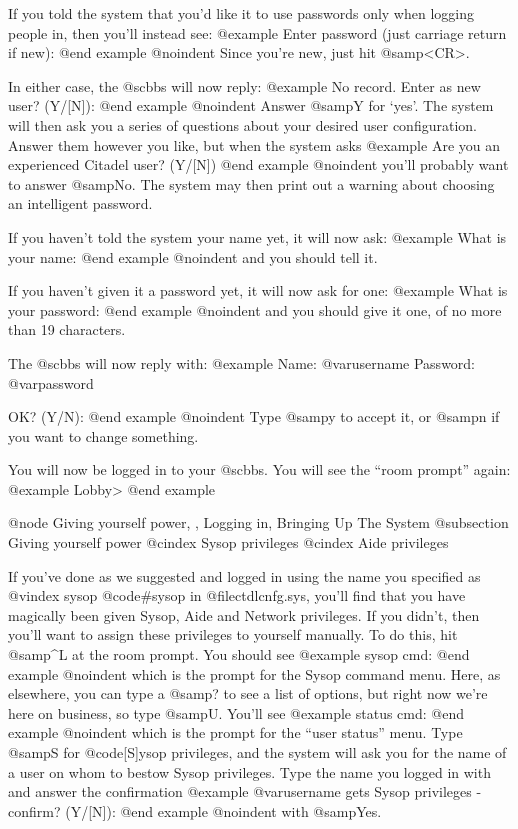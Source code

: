 If you told the system that you'd like it to use passwords only when logging
people in, then you'll instead see:
@example
Enter password (just carriage return if new):
@end example
@noindent
Since you're new, just hit @samp{<CR>}.

In either case, the @sc{bbs} will now reply:
@example
No record. Enter as new user? (Y/[N]):
@end example
@noindent
Answer @samp{Y} for `yes'.  The system will then ask you a series of questions
about your desired user configuration.   Answer them however you like, but
when the system asks
@example
Are you an experienced Citadel user? (Y/[N])
@end example
@noindent
you'll probably want to answer @samp{No}.  The system may then print out a
warning about choosing an intelligent password.

If you haven't told the system your name yet, it will now ask:
@example
What is your name:
@end example
@noindent
and you should tell it.

If you haven't given it a password yet, it will now ask for one:
@example
What is your password:
@end example
@noindent
and you should give it one, of no more than 19 characters.

The @sc{bbs} will now reply with:
@example
Name: @var{username}
Password: @var{password}

OK? (Y/N):
@end example
@noindent
Type @samp{y} to accept it, or @samp{n} if you want to change something.

You will now be logged in to your @sc{bbs}.  You will see the ``room prompt'' again:
@example
Lobby>
@end example

@node Giving yourself power,  , Logging in, Bringing Up The System
@subsection Giving yourself power
@cindex Sysop privileges
@cindex Aide privileges

If you've done as we suggested and logged in using the name you specified as
@vindex sysop
@code{#sysop} in @file{ctdlcnfg.sys}, you'll find that you have magically been
given Sysop, Aide and Network privileges.  If you didn't, then you'll want to
assign these privileges to yourself manually.  To do this, hit @samp{^L} at
the room prompt.  You should see
@example
sysop cmd:
@end example
@noindent
which is the prompt for the Sysop command menu.  Here, as elsewhere, you can
type a @samp{?}
to see a list of options, but right now we're here on business, so type
@samp{U}.  You'll see
@example
status cmd:
@end example
@noindent
which is the prompt for the ``user status'' menu.  Type @samp{S} for
@code{[S]ysop privileges}, and the system will ask you for the name of a user
on whom to bestow Sysop privileges.  Type the name you logged in with and 
answer the confirmation
@example
@var{username} gets Sysop privileges - confirm? (Y/[N]):
@end example
@noindent
with @samp{Yes}.

